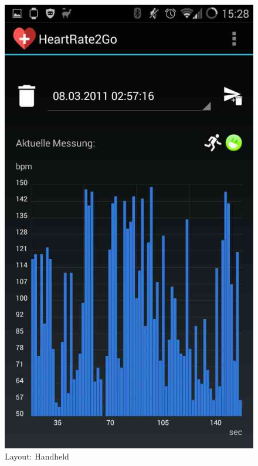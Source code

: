 \begin{minipage}[c]{0.5\textwidth}
	\begin{figure}[H]
		\centering
		\includegraphics[scale=0.3]{images/layout_handheld.jpg}
		\caption{Layout: Handheld}
		\label{fig:layout_handheld}
	\end{figure}
\end{minipage}
